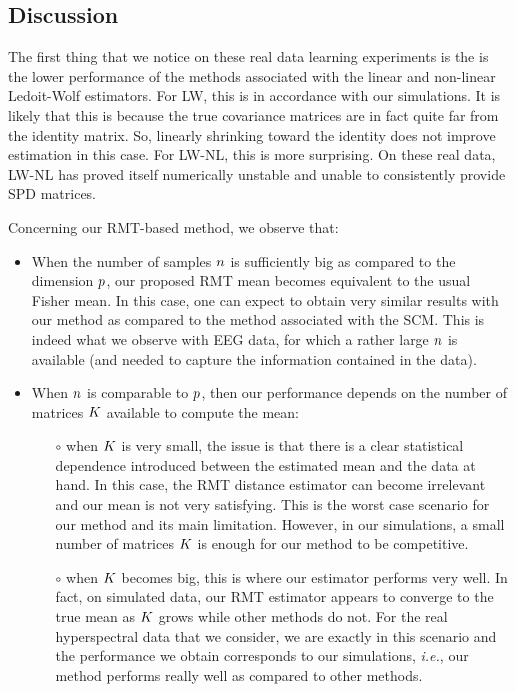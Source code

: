 \documentclass{article}
\theoremstyle{plain}
\theoremstyle{definition}
\theoremstyle{remark}
\begin{document}
\subsection{Discussion}
The first thing that we notice on these real data learning experiments is the is the lower performance of the methods associated with the linear and non-linear Ledoit-Wolf estimators.
%
For LW, this is in accordance with our simulations.
It is likely that this is because the true covariance matrices are in fact quite far from the identity matrix.
So, linearly shrinking toward the identity does not improve estimation in this case.
%
For LW-NL, this is more surprising.
On these real data, LW-NL has proved itself numerically unstable and unable to consistently provide SPD matrices.

Concerning our RMT-based method, we observe that:
\begin{itemize}
    \item When the number of samples $n$ is sufficiently big as compared to the dimension $p$, our proposed RMT mean becomes equivalent to the usual Fisher mean.
    In this case, one can expect to obtain very similar results with our method as compared to the method associated with the SCM.
    This is indeed what we observe with EEG data, for which a rather large $n$ is available (and needed to capture the information contained in the data).
    \item When $n$ is comparable to $p$, then our performance depends on the number of matrices $K$ available to compute the mean:
    \begin{itemize}
        \item[$\circ$] when $K$ is very small, the issue is that there is a clear statistical dependence introduced between the estimated mean and the data at hand.
        In this case, the RMT distance estimator can become irrelevant and our mean is not very satisfying.
        This is the worst case scenario for our method and its main limitation.
        However, in our simulations, a small number of matrices $K$ is enough for our method to be competitive.
        \item[$\circ$] when $K$ becomes big, this is where our estimator performs very well.
        In fact, on simulated data, our RMT estimator appears to converge to the true mean as $K$ grows while other methods do not.
        For the real hyperspectral data that we consider, we are exactly in this scenario and the performance we obtain corresponds to our simulations, \emph{i.e.}, our method performs really well as compared to other methods.
    \end{itemize}
\end{itemize}
\end{document}
